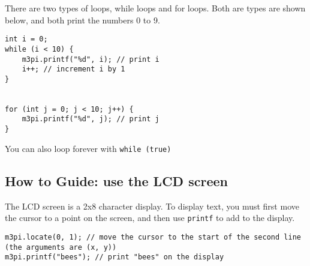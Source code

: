 There are two types of loops, while loops and for loops. Both are types
are shown below, and both print the numbers 0 to 9.

\begin{lstlisting}
int i = 0;
while (i < 10) {
    m3pi.printf("%d", i); // print i
    i++; // increment i by 1
}


for (int j = 0; j < 10; j++) {
    m3pi.printf("%d", j); // print j
}
\end{lstlisting}

You can also loop forever with \lstinline!while (true)!

\subsection{How to Guide: use the LCD
screen}\label{how-to-guide-use-the-lcd-screen}

The LCD screen is a 2x8 character display. To display text, you must
first move the cursor to a point on the screen, and then use
\lstinline!printf! to add to the display.

\begin{lstlisting}
m3pi.locate(0, 1); // move the cursor to the start of the second line (the arguments are (x, y))
m3pi.printf("bees"); // print "bees" on the display
\end{lstlisting}

